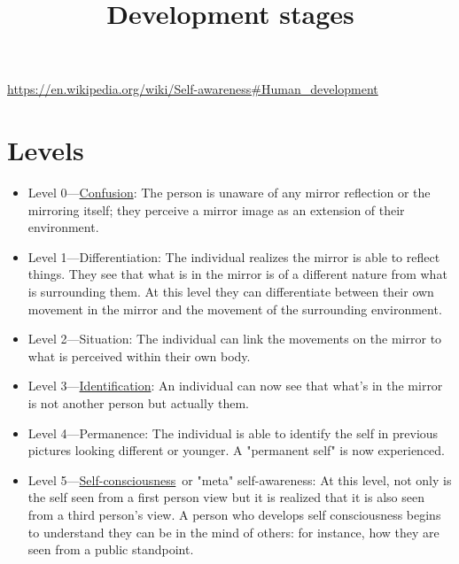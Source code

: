 \documentclass[a4paper]{article}
\title{Development stages}
\date{}
\begin{document}
    \maketitle
    \url{https://en.wikipedia.org/wiki/Self-awareness#Human_development}
    \section{Levels}
        \begin{itemize}
            \item Level 0—\href{https://en.wikipedia.org/wiki/Confusion}{Confusion}: The person is unaware of any mirror reflection or the mirroring itself; they perceive a mirror image as an extension of their environment.
        \end{itemize}
        \begin{itemize}
            \item Level 1—Differentiation: The individual realizes the mirror is able to reflect things. They see that what is in the mirror is of a different nature from what is surrounding them. At this level they can differentiate between their own movement in the mirror and the movement of the surrounding environment.
        \end{itemize}
        \begin{itemize}
            \item Level 2—Situation: The individual can link the movements on the mirror to what is perceived within their own body.
        \end{itemize}
        \begin{itemize}
            \item Level 3—\href{https://en.wikipedia.org/wiki/Identification_(psychology)}{Identification}: An individual can now see that what's in the mirror is not another person but actually them.
        \end{itemize}
        \begin{itemize}
            \item Level 4—Permanence: The individual is able to identify the self in previous pictures looking different or younger. A "permanent self" is now experienced.
        \end{itemize}
        \begin{itemize}
            \item Level 5—\href{https://en.wikipedia.org/wiki/Self-consciousness}{Self-consciousness} or "meta" self-awareness: At this level, not only is the self seen from a first person view but it is realized that it is also seen from a third person's view. A person who develops self consciousness begins to understand they can be in the mind of others: for instance, how they are seen from a public standpoint.
        \end{itemize}

\end{document}
